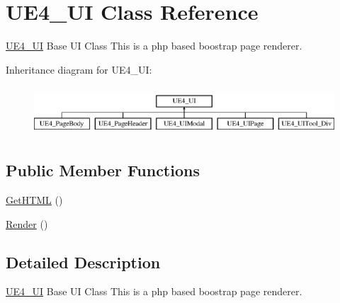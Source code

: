 \hypertarget{class_u_e4___u_i}{\section{U\-E4\-\_\-\-U\-I Class Reference}
\label{class_u_e4___u_i}
}


\hyperlink{class_u_e4___u_i}{U\-E4\-\_\-\-U\-I} Base U\-I Class This is a php based boostrap page renderer.  


Inheritance diagram for U\-E4\-\_\-\-U\-I\-:\begin{figure}[H]
\begin{center}
\leavevmode
\includegraphics[height=1.851240cm]{class_u_e4___u_i}
\end{center}
\end{figure}
\subsection*{Public Member Functions}
\begin{DoxyCompactItemize}
\item 
\hyperlink{class_u_e4___u_i_abc99f9ea27a455eed49d783d5e03c4ad}{Get\-H\-T\-M\-L} ()
\item 
\hyperlink{class_u_e4___u_i_a1a6915de89093bc6383d7c1f18ab81e2}{Render} ()
\end{DoxyCompactItemize}


\subsection{Detailed Description}
\hyperlink{class_u_e4___u_i}{U\-E4\-\_\-\-U\-I} Base U\-I Class This is a php based boostrap page renderer. 



